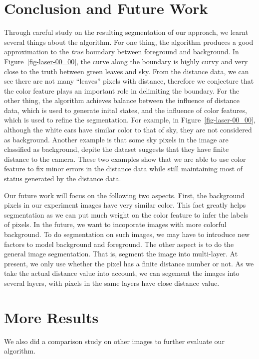 \documentclass{article} %
\begin{document}
\section{Conclusion and Future Work}

Through careful study on the resulting segmentation of our approach,
we learnt several things about the algorithm.
For one thing, the algorithm produces a good approximation to the
\emph{true} boundary between foreground and background. 
In Figure~\ref{fig-laser-00_00}, the curve along the boundary is highly curvy and very close to
the truth between green leaves and sky. From the distance
data, we can see there are not many ``leaves'' pixels with distance,
therefore we conjecture that the color feature plays an important role
in delimiting the boundary.
For the other thing, the algorithm achieves balance between the
influence of distance data, which is used to generate inital states,
and the influence of color features, which is used to refine the
segmentation. 
For example, in Figure~\ref{fig-laser-00_00}, although the white cars have similar color
to that of sky, they are not considered as background.  
Another example is that some sky pixels in the image are classified
as background, depite the dataset suggests that they have finite
distance to the camera.  
These two examples show that we are able to use color feature to fix
minor errors in the distance data while still maintaining most of
status generated by the distance data.

Our future work will focus on the following two aspects.
First, the background pixels in our experiment images have very
similar color. This fact greatly helps segmentation as we can put much
weight on the color feature to infer the labels of pixels. In the
future, we want to incoporate images with more colorful
background. To do segmentation on such images, we may have to
introduce new factors to model background and foreground.
The other aspect is to do the general image segmentation. That is,
segment the image into multi-layer. At present, we only use whether
the pixel has a finite distance number or not. As we take the actual
distance value into account, we can segement the images into several
layers, with pixels in the same layers have close distance value.

\section{More Results}
We also did a comparison study on other images to further evaluate our algorithm. 
\end{document}

